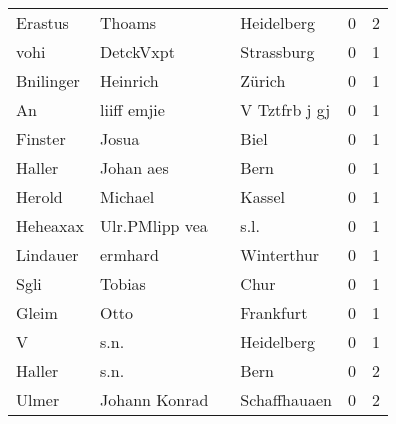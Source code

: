 \begin{tabular}{llllrr}
                  Erastus &                             Thoams &             &                                  Heidelberg &          0 &         2 \\
                     vohi &                          DetckVxpt &             &                                  Strassburg &          0 &         1 \\
                Bnilinger &                           Heinrich &             &                                      Zürich &          0 &         1 \\
                       An &                        liiff emjie &             &                               V Tztfrb j gj &          0 &         1 \\
                  Finster &                              Josua &             &                                        Biel &          0 &         1 \\
                   Haller &                          Johan aes &             &                                        Bern &          0 &         1 \\
                   Herold &                            Michael &             &                                      Kassel &          0 &         1 \\
                 Heheaxax &                     Ulr.PMlipp vea &             &                                        s.l. &          0 &         1 \\
                 Lindauer &                            ermhard &             &                                  Winterthur &          0 &         1 \\
                     Sgli &                             Tobias &             &                                        Chur &          0 &         1 \\
                    Gleim &                               Otto &             &                                   Frankfurt &          0 &         1 \\
                        V &                               s.n. &             &                                  Heidelberg &          0 &         1 \\
                   Haller &                               s.n. &             &                                        Bern &          0 &         2 \\
                    Ulmer &                      Johann Konrad &             &                                Schaffhauaen &          0 &         2 \\

\end{tabular}
